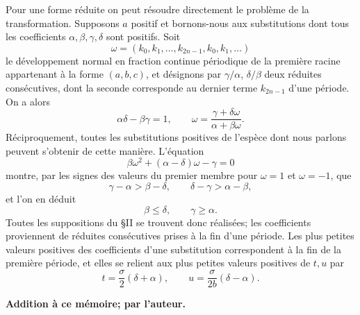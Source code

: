 \documentclass[11pt]{article}
\begin{document}
Pour une forme réduite on peut résoudre directement le problème de la transformation. Supposons $a$ positif et bornons-nous aux substitutions dont tous les coefficients $\alpha,\beta,\gamma,\delta$ sont positifs. Soit
\[
 \omega=(k_0,k_1,\ldots,k_{2n-1},k_0,k_1,\ldots)
\]
le développement normal en fraction continue périodique de la première racine appartenant à la forme $(a,b,c)$, et désignons par $\gamma/\alpha$, $\delta/\beta$ deux réduites consécutives, dont la seconde corresponde au dernier terme $k_{2n-1}$ d'une période. On a alors
\[
 \alpha\delta-\beta\gamma=1,
 \qquad
 \omega=\frac{\gamma+\delta\omega}{\alpha+\beta\omega}.
\]
Réciproquement, toutes les substitutions positives de l'espèce dont nous parlons peuvent s'obtenir de cette manière. L'équation
\[
  \beta\omega^2+(\alpha-\delta)\omega-\gamma=0
\]
montre, par les signes des valeurs du premier membre pour $\omega=1$ et $\omega=-1$, que
\[
  \gamma-\alpha>\beta-\delta,
  \qquad
  \delta-\gamma>\alpha-\beta,
\]
et l'on en déduit
\[
  \beta\leq\delta,
  \qquad
  \gamma\geq\alpha.
\]
Toutes les suppositions du \S II se trouvent donc réalisées; les coefficients proviennent de réduites consécutives prises à la fin d'une période. Les plus petites valeurs positives des coefficients d'une substitution correspondent à la fin de la première période, et elles se relient aux plus petites valeurs positives de $t,u$ par
\[
  t=\frac{\sigma}{2}(\delta+\alpha),\qquad
  u=\frac{\sigma}{2b}(\delta-\alpha).
\]

\begin{center}
\textbf{Addition à ce mémoire; par l'auteur.}
\end{center}
\end{document}

